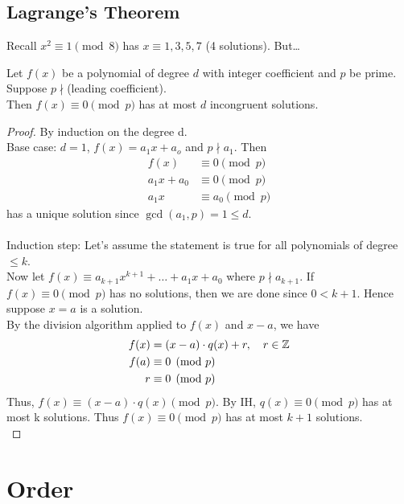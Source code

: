     \subsection{Lagrange's Theorem}
    Recall $x^2\equiv 1\pmod{8}$ has $x\equiv 1,3,5,7$ (4 solutions). But\dots
    \begin{theorem} 
        Let $f(x)$ be a polynomial of degree $d$ with integer coefficient
        and $p$ be prime. Suppose $p\nmid $(leading coefficient). \\
        Then $f(x)\equiv 0\pmod{p}$ has at most $d$ incongruent solutions.
        \begin{proof} 
            By induction on the degree d. \\
            Base case: $d=1$, $f(x) = a_1x+a_o$ and $p\nmid a_1$. 
            Then 
            \begin{align*}
                f(x) &\equiv 0\pmod{p} \\
                a_1x+a_0 &\equiv 0\pmod{p} \\
                a_1x &\equiv a_0\pmod{p}
            \end{align*}
            has a unique solution since $\gcd(a_1,p) = 1\le d$. \\\\
            Induction step: Let's assume the statement is true for all 
            polynomials of degree $\le k$. \\
            Now let 
            $f(x)\equiv a_{k+1}x^{k+1}+\dots+a_1x+a_0$ where $p\nmid a_{k+1}$.
            If $f(x)\equiv 0\pmod{p}$ has no solutions, then we are done since
            $0<k+1$. Hence suppose $x=a$ is a solution. \\
            By the division algorithm applied to $f(x)$ and $x-a$, we have
            \begin{align*}
                f(x) &= (x-a)\cdot q(x) + r, \quad r\in\mathbb{Z}  \\
                f(a) &\equiv 0\pmod{p} \\
                r &\equiv 0\pmod{p}
            \end{align*}
            Thus, $f(x)\equiv (x-a)\cdot q(x)\pmod{p}$. By IH, $q(x)\equiv 0\pmod{p}$
            has at most k solutions. Thus $f(x)\equiv 0\pmod{p}$ has at most $k+1$ solutions. \\
        \end{proof}
    \end{theorem}

\section{Order}
